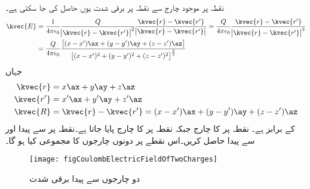 نقطہ  پر موجود چارج  سے نقطہ  پر برقی شدت  یوں حاصل کی جا سکتی ہے۔
\begin{gather}
\begin{aligned} \label{مساوات_کولومب_نقطہ_چارج_سے_میدان_کا_حصول}
\kvec{E}&=\frac{1}{4 \pi \epsilon_0 }\frac{Q}{\abs{\kvec{r}-\kvec{r'}}^2} \frac{\kvec{r}-\kvec{r'}}{\abs{\kvec{r}-\kvec{r'}}}=\frac{Q}{4 \pi \epsilon_0 }\frac{\kvec{r}-\kvec{r'}}{\abs{\kvec{r}-\kvec{r'}}^3}\\
&=\frac{Q}{4 \pi \epsilon_0}\frac{\left[(x-x')\ax+(y-y')\ay+(z-z')\az\right]}{\left [(x-x')^2+(y-y')^2+(z-z')^2\right]^{\frac{3}{2}}}
\end{aligned}
\end{gather} 
جہاں
\begin{align*}
\kvec{r}&=x \ax+y \ay+z\az\\
\kvec{r'}&=x' \ax+y' \ay+z'\az\\
\kvec{R}&=\kvec{r}-\kvec{r'}=(x-x') \ax+(y-y') \ay+(z-z')\az
\end{align*}
کے برابر ہے۔
نقطہ  پر  کا چارج  جبکہ نقطہ  پر  کا چارج  پایا جاتا ہے۔نقطہ  پر   سے پیدا   اور  سے پیدا  حاصل کریں۔اس نقطے پر دونوں چارجوں کا مجموعی  کیا ہو گا۔
\begin{figure}
\centering
\texttt{[image: figCoulombElectricFieldOfTwoCharges]}
\caption{دو چارجوں سے پیدا برقی شدت}
\label{شکل_کولومب_دو_چارجوں_سے_پیدا_برقی_شدت}
\end{figure}

